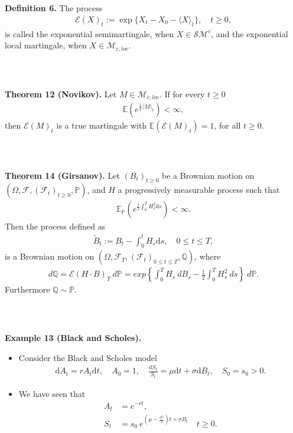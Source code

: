 \documentclass{beamer}
\numberwithin{equation}{section}
\newenvironment{frame2}{\begin{frame}\frametitle{{\normalsize \secname} \\ {\large \subsecname}}}{\end{frame}}
\begin{document}
\begin{frame2}
    \textbf{Definition 6.}
    The process
    \begin{align*}
        \mathcal{E}(X)_t:=\exp\{X_t-X_0-\langle X \rangle_t\}, \quad t\geq 0,
    \end{align*}
    is called the exponential semimartingale, when $X\in\mathcal{S}\mathcal{M}^c$, and the exponential local martingale, when $X\in\mathcal{M}_{c,loc}$.
\end{frame2}

\begin{frame2}
    \textbf{Theorem 12 (Novikov).}
    Let $M\in\mathcal{M}_{c, loc}$.
    If for every $t\geq 0$
    \begin{align*}
        \mathbb{E}(e^{\frac{1}{2}\langle M\rangle_t})<\infty,
    \end{align*}
    then $\mathcal{E}(M)_t$ is a true martingale with $\mathbb{E}(\mathcal{E}(M)_t)=1$, for all $t\geq 0$.
\end{frame2}

\begin{frame2}
    \textbf{Theorem 14 (Girsanov).}
    Let $(B_t)_{t\geq 0}$ be a Brownian motion on $(\Omega, \mathscr{F}, (\mathscr{F}_t)_{t\geq 0}, \mathbb{P})$, and $H$ a progressively measurable process such that 
    \begin{align*}
        \mathbb{E}_{\mathbb{P}}(e^{\frac{1}{2}\int_0^T H_s^2 \text{d}s})<\infty.
    \end{align*}
    Then the process defined as
    \begin{align*}
        \tilde{B}_t:=B_t-\int_0^t H_s \text{d}s, \quad 0\leq t\leq T,
    \end{align*}
    is a Brownian motion on $(\Omega, \mathscr{F}_T, (\mathscr{F}_t)_{0\leq t\leq T}, \mathbb{Q})$, where
    \begin{align*}
        d\mathbb{Q}=\mathcal{E}(H\cdot B)_T \ d \mathbb{P} = exp\left\{\int_0^T H_s \ d B_s - \frac{1}{2} \int_0^T H_s^2 \ ds\right\} \ d \mathbb{P}.
    \end{align*}
    Furthermore $\mathbb{Q} \sim \mathbb{P}$.
\end{frame2}

\begin{frame2}
    \textbf{Example 13 (Black and Scholes).}
    \begin{itemize}
        \item Consider the Black and Scholes model
        \begin{align*}
            \text{d}A_t=rA_t\text{d}t, \quad A_0=1, \quad \frac{\text{d}S_t}{S_t}=\mu \text{d}t+\sigma \text{d} B_t, \quad S_0=s_0>0.
        \end{align*}
        \item We have seen that
        \begin{align*}
            A_t&=e^{-rt},\\
            S_t&=s_0 \ e^{(\mu-\frac{\sigma^2}{2})t+\sigma B_t} \quad t \geq 0.
        \end{align*}
    \end{itemize}
\end{frame2}
\end{document}
